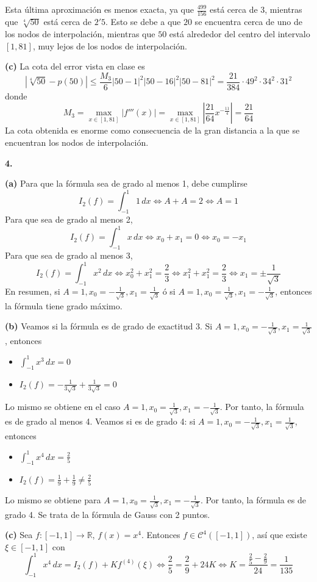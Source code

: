 \documentclass[12pt]{report}
\newcommand{\R}{\mathbb R}
\begin{document}
\vspace{2mm}
Esta última aproximación es menos exacta, ya que $\frac{499}{156}$ está cerca de 3, mientras que $\sqrt[4]{50}$ está cerca de $2'5$. Esto se debe a que $20$ se encuentra cerca de uno de los nodos de interpolación, mientras que $50$ está alrededor del centro del intervalo $[1,81]$, muy lejos de los nodos de interpolación.

\vspace{2mm}
\textbf{(c) } La cota del error vista en clase es
\[|\sqrt[4]{50}-p(50)| \leq \frac{M_3}{6}|50-1|^2|50-16|^2|50-81|^2 = \frac{21}{384} \cdot 49^2 \cdot 34^2 \cdot 31^2\]
donde
\[M_3 = \max_{x \in [1,81]} |f'''(x)| = \max_{x \in [1,81]} |\frac{21}{64}x^{-\frac{11}{4}}| = \frac{21}{64}\]
La cota obtenida es enorme como consecuencia de la gran distancia a la que se encuentran los nodos de interpolación.

\vspace{2mm}
\textbf{4. }

\vspace{2mm}
\textbf{(a) } Para que la fórmula sea de grado al menos 1, debe cumplirse
\[I_2(f) = \int_{-1}^1 1 \, dx \iff A + A = 2 \iff A = 1\]
Para que sea de grado al menos 2,
\[I_2(f) = \int_{-1}^1 x \, dx \iff x_0 + x_1 = 0 \iff x_0 = -x_1\]
Para que sea de grado al menos 3,
\[I_2(f) = \int_{-1}^1 x^2 \, dx \iff x_0^2 + x_1^2 = \frac{2}{3} \iff x_1^2 + x_1^2 = \frac{2}{3} \iff x_1 = \pm \frac{1}{\sqrt{3}}\]
En resumen, si $A = 1, x_0 = -\frac{1}{\sqrt{3}}, x_1 = \frac{1}{\sqrt{3}}$ ó si $A = 1, x_0 = \frac{1}{\sqrt{3}}, x_1 = -\frac{1}{\sqrt{3}}$, entonces la fórmula tiene grado máximo.

\vspace{2mm}
\textbf{(b) } Veamos si la fórmula es de grado de exactitud 3. Si $A = 1, x_0 = -\frac{1}{\sqrt{3}}, x_1 = \frac{1}{\sqrt{3}}$, entonces
\begin{itemize}
    \item $\displaystyle \int_{-1}^1 x^3 \, dx = 0$
    \item $\displaystyle I_2(f) = -\frac{1}{3\sqrt{3}} + \frac{1}{3\sqrt{3}} = 0$
\end{itemize}
Lo mismo se obtiene en el caso $A = 1, x_0 = \frac{1}{\sqrt{3}}, x_1 = -\frac{1}{\sqrt{3}}$. Por tanto, la fórmula es de grado al menos 4. Veamos si es de grado 4: si $A = 1, x_0 = -\frac{1}{\sqrt{3}}, x_1 = \frac{1}{\sqrt{3}}$, entonces
\begin{itemize}
    \item $\displaystyle \int_{-1}^1 x^4 \, dx = \frac{2}{5}$
    \item $\displaystyle I_2(f) = \frac{1}{9} + \frac{1}{9} \neq \frac{2}{5}$
\end{itemize}
Lo mismo se obtiene para $A = 1, x_0 = \frac{1}{\sqrt{3}}, x_1 = -\frac{1}{\sqrt{3}}$. Por tanto, la fórmula es de grado 4. Se trata de la fórmula de Gauss con 2 puntos.

\vspace{2mm}
\textbf{(c) } Sea $f \colon [-1,1] \to \R$, $f(x) = x^4$. Entonces $f \in \mathcal{C}^4([-1,1])$, así que existe $\xi \in [-1,1]$ con
\[\int_{-1}^1 x^4 \, dx = I_2(f) + Kf^{(4)}(\xi) \iff \frac{2}{5} = \frac{2}{9} + 24K \iff K = \frac{\frac{2}{5}-\frac{2}{9}}{24} = \frac{1}{135}\]
\end{document}
